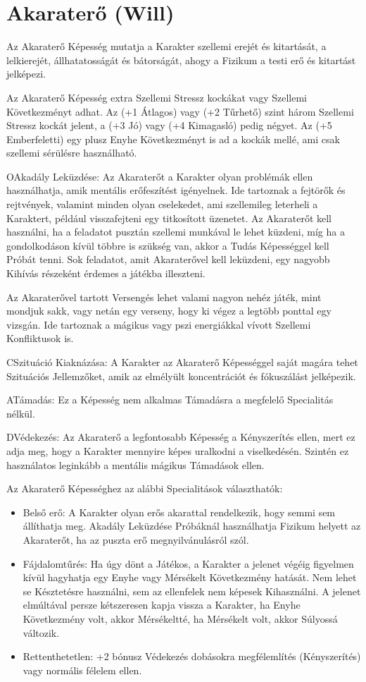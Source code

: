 \label{Akaraterő}
\section[Akaraterő]{Akaraterő (Will)}

Az Akaraterő Képesség mutatja a Karakter szellemi erejét és kitartását, a lelkierejét, állhatatosságát és bátorságát, ahogy a Fizikum a testi erő és kitartást jelképezi.

Az Akaraterő Képesség extra Szellemi Stressz kockákat vagy Szellemi Következményt adhat. Az (+1 Átlagos) vagy (+2 Tűrhető) szint három Szellemi Stressz kockát jelent, a (+3 Jó) vagy (+4 Kimagasló) pedig négyet. Az (+5 Emberfeletti) egy plusz Enyhe Következményt is ad a kockák mellé, ami csak szellemi sérülésre használható.

OAkadály Leküzdése: Az Akaraterőt a Karakter olyan problémák ellen használhatja, amik mentális erőfeszítést igényelnek. Ide tartoznak a fejtörők és rejtvények, valamint minden olyan cselekedet, ami szellemileg leterheli a Karaktert, például visszafejteni egy titkosított üzenetet. Az Akaraterőt kell használni, ha a feladatot pusztán szellemi munkával le lehet küzdeni, míg ha a gondolkodáson kívül többre is szükség van, akkor a Tudás Képességgel kell Próbát tenni. Sok feladatot, amit Akaraterővel kell leküzdeni, egy nagyobb Kihívás részeként érdemes a játékba illeszteni.

Az Akaraterővel tartott Versengés lehet valami nagyon nehéz játék, mint mondjuk sakk, vagy netán egy verseny, hogy ki végez a legtöbb ponttal egy vizsgán. Ide tartoznak a mágikus vagy pszi energiákkal vívott Szellemi Konfliktusok is.

CSzituáció Kiaknázása: A Karakter az Akaraterő Képességgel saját magára tehet Szituációs Jellemzőket, amik az elmélyült koncentrációt és fókuszálást jelképezik.

ATámadás: Ez a Képesség nem alkalmas Támadásra a megfelelő Specialitás nélkül.
 
DVédekezés: Az Akaraterő a legfontosabb Képesség a Kényszerítés ellen, mert ez adja meg, hogy a Karakter mennyire képes uralkodni a viselkedésén. Szintén ez használatos leginkább a mentális mágikus Támadások ellen.

Az Akaraterő Képességhez az alábbi Specialitások választhatók:

\begin{itemize}
    \item Belső erő: A Karakter olyan erős akarattal rendelkezik, hogy semmi sem állíthatja meg. Akadály Leküzdése Próbáknál használhatja Fizikum helyett az Akaraterőt, ha az puszta erő megnyilvánulásról szól.
    \item Fájdalomtűrés: Ha úgy dönt a Játékos, a Karakter a jelenet végéig figyelmen kívül hagyhatja egy Enyhe vagy Mérsékelt Következmény hatását. Nem lehet se Késztetésre használni, sem az ellenfelek nem képesek Kihasználni. A jelenet elmúltával persze kétszeresen kapja vissza a Karakter, ha Enyhe Következmény volt, akkor Mérsékeltté, ha Mérsékelt volt, akkor Súlyossá változik.
    \item Rettenthetetlen: +2 bónusz Védekezés dobásokra megfélemlítés (Kényszerítés) vagy normális félelem ellen.
\end{itemize}
